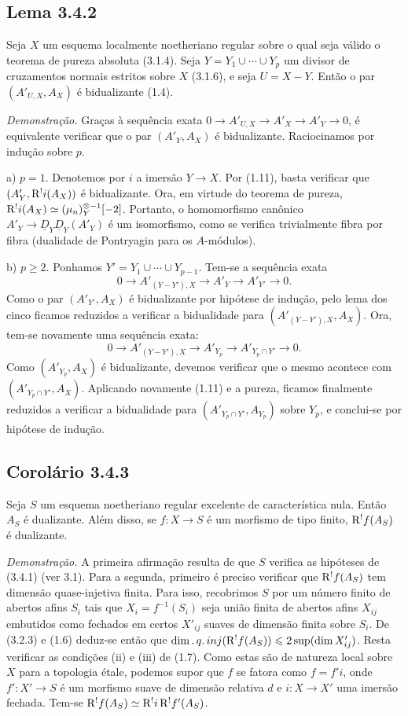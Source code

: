 \subsection*{Lema 3.4.2}
Seja $X$ um esquema localmente noetheriano regular sobre o qual seja válido o teorema de pureza absoluta (3.1.4). Seja $Y = Y_1 \cup \cdots \cup Y_p$ um divisor de cruzamentos normais estritos sobre $X$ (3.1.6), e seja $U = X - Y$. Então o par $(A'_{U,X}, A_X)$ é bidualizante (1.4).

\emph{Demonstração.} Graças à sequência exata $0 \to A'_{U,X} \to A'_X \to A'_Y \to 0$, é equivalente verificar que o par $(A'_Y, A_X)$ é bidualizante. Raciocinamos por indução sobre $p$.

a) $p = 1$. Denotemos por $i$ a imersão $Y \to X$. Por (1.11), basta verificar que $(A'_Y, \mathrm{R}^{!}i(A_X))$ é bidualizante. Ora, em virtude do teorema de pureza, $\mathrm{R}^{!}i(A_X) \simeq (\mu_n)^{\otimes -1}_Y[-2]$. Portanto, o homomorfismo canônico $A'_Y \to \underline{D}_Y \underline{D}_Y(A'_Y)$ é um isomorfismo, como se verifica trivialmente fibra por fibra (dualidade de Pontryagin para os $A$-módulos).

b) $p \geqslant 2$. Ponhamos $Y' = Y_1 \cup \cdots \cup Y_{p-1}$. Tem-se a sequência exata
\[
0 \longrightarrow A'_{(Y-Y'),X} \longrightarrow A'_Y \longrightarrow A'_{Y'} \longrightarrow 0.
\]
Como o par $(A'_{Y'}, A_X)$ é bidualizante por hipótese de indução, pelo lema dos cinco ficamos reduzidos a verificar a bidualidade para $(A'_{(Y-Y'),X}, A_X)$. Ora, tem-se novamente uma sequência exata:
\[
0 \longrightarrow A'_{(Y-Y'),X} \longrightarrow A'_{Y_p} \longrightarrow A'_{Y_p \cap Y'} \longrightarrow 0.
\]
Como $(A'_{Y_p}, A_X)$ é bidualizante, devemos verificar que o mesmo acontece com $(A'_{Y_p \cap Y'}, A_X)$. Aplicando novamente (1.11) e a pureza, ficamos finalmente reduzidos a verificar a bidualidade para $(A'_{Y_p \cap Y'}, A_{Y_p})$ sobre $Y_p$, e conclui-se por hipótese de indução.

\subsection*{Corolário 3.4.3}
Seja $S$ um esquema noetheriano regular excelente de característica nula. Então $A_S$ é dualizante. Além disso, se $f : X \to S$ é um morfismo de tipo finito, $\mathrm{R}^{!}f(A_S)$ é dualizante.

\emph{Demonstração.} A primeira afirmação resulta de que $S$ verifica as hipóteses de (3.4.1) (ver 3.1). Para a segunda, primeiro é preciso verificar que $\mathrm{R}^{!}f(A_S)$ tem dimensão quase-injetiva finita. Para isso, recobrimos $S$ por um número finito de abertos afins $S_i$ tais que $X_i = f^{-1}(S_i)$ seja união finita de abertos afins $X_{ij}$ embutidos como fechados em certos $X'_{ij}$ suaves de dimensão finita sobre $S_i$. De (3.2.3) e (1.6) deduz-se então que $\dim.\,q.\,inj(\mathrm{R}^{!}f(A_S)) \leqslant 2\sup(\dim X'_{ij})$. Resta verificar as condições (ii) e (iii) de (1.7). Como estas são de natureza local sobre $X$ para a topologia étale, podemos supor que $f$ se fatora como $f = f'i$, onde $f' : X' \to S$ é um morfismo suave de dimensão relativa $d$ e $i : X \to X'$ uma imersão fechada. Tem-se $\mathrm{R}^{!}f(A_S) \simeq \mathrm{R}^{!}i \, \mathrm{R}^{!}f'(A_S)$.

